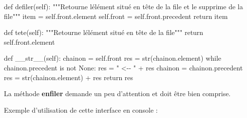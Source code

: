 \documentclass[
  letterpaper,
  DIV=11,
  numbers=noendperiod]{scrartcl}
\newenvironment{Shaded}{\begin{snugshade}}{\end{snugshade}}
\newcommand{\BuiltInTok}[1]{\textcolor[rgb]{0.00,0.23,0.31}{#1}}
\newcommand{\CommentTok}[1]{\textcolor[rgb]{0.37,0.37,0.37}{#1}}
\newcommand{\ControlFlowTok}[1]{\textcolor[rgb]{0.00,0.23,0.31}{#1}}
\newcommand{\FunctionTok}[1]{\textcolor[rgb]{0.28,0.35,0.67}{#1}}
\newcommand{\KeywordTok}[1]{\textcolor[rgb]{0.00,0.23,0.31}{#1}}
\newcommand{\NormalTok}[1]{\textcolor[rgb]{0.00,0.23,0.31}{#1}}
\newcommand{\OperatorTok}[1]{\textcolor[rgb]{0.37,0.37,0.37}{#1}}
\newcommand{\StringTok}[1]{\textcolor[rgb]{0.13,0.47,0.30}{#1}}
\newcommand{\VariableTok}[1]{\textcolor[rgb]{0.07,0.07,0.07}{#1}}
\begin{document}
\begin{Shaded}
\begin{Highlighting}[]
    \KeywordTok{def}\NormalTok{ defiler(}\VariableTok{self}\NormalTok{):}
        \CommentTok{"""Retourne l\textquotesingle{}élément situé en tête de la file et le supprime de la file"""}
\NormalTok{        item }\OperatorTok{=} \VariableTok{self}\NormalTok{.front.element}
        \VariableTok{self}\NormalTok{.front }\OperatorTok{=} \VariableTok{self}\NormalTok{.front.precedent}
        \ControlFlowTok{return}\NormalTok{ item}

    \KeywordTok{def}\NormalTok{ tete(}\VariableTok{self}\NormalTok{):}
        \CommentTok{"""Retourne l\textquotesingle{}élément situé en tête de la file"""}
        \ControlFlowTok{return} \VariableTok{self}\NormalTok{.front.element}

    \KeywordTok{def} \FunctionTok{\_\_str\_\_}\NormalTok{(}\VariableTok{self}\NormalTok{):}
\NormalTok{        chainon }\OperatorTok{=} \VariableTok{self}\NormalTok{.front}
\NormalTok{        res }\OperatorTok{=} \BuiltInTok{str}\NormalTok{(chainon.element)}
        \ControlFlowTok{while}\NormalTok{ chainon.precedent }\KeywordTok{is} \KeywordTok{not} \VariableTok{None}\NormalTok{:}
\NormalTok{            res }\OperatorTok{=} \StringTok{" \textless{}{-}{-} "} \OperatorTok{+}\NormalTok{ res}
\NormalTok{            chainon }\OperatorTok{=}\NormalTok{ chainon.precedent}
\NormalTok{            res }\OperatorTok{=} \BuiltInTok{str}\NormalTok{(chainon.element) }\OperatorTok{+}\NormalTok{ res}
        \ControlFlowTok{return}\NormalTok{ res}
\end{Highlighting}
\end{Shaded}

La méthode \textbf{enfiler} demande un peu d'attention et doit être bien
comprise.

Exemple d'utilisation de cette interface en console :
\end{document}
